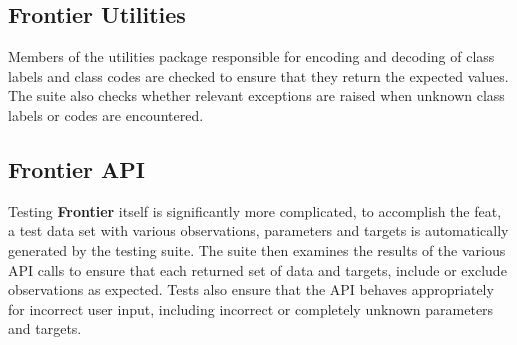 \subsection{Frontier Utilities}

Members of the utilities package responsible for
encoding and decoding of class labels and class codes are checked to ensure that
they return the expected values. The suite also checks whether relevant exceptions
are raised when unknown class labels or codes are encountered.

\subsection{Frontier API}

Testing \textbf{Frontier} itself is significantly more complicated, to
accomplish the feat, a test data set with various observations, parameters and
targets is automatically generated by the testing suite.  The suite then
examines the results of the various API calls to ensure that each returned set
of data and targets, include or exclude observations as expected.  Tests also
ensure that the API behaves appropriately for incorrect user input, including
incorrect or completely unknown parameters and targets.

